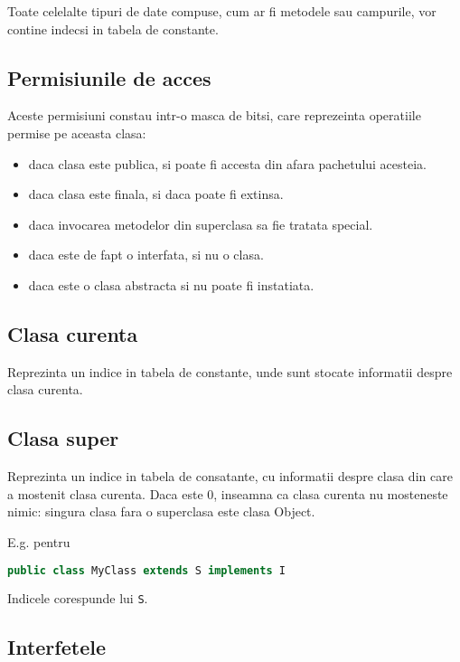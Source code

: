 Toate celelalte tipuri de date compuse, cum ar fi metodele sau
campurile, vor contine indecsi in tabela de constante.

\subsection{Permisiunile de acces}

Aceste permisiuni constau intr-o masca de bitsi, care reprezeinta
operatiile permise pe aceasta clasa:

\begin{itemize}
    \item daca clasa este publica, si poate fi accesta din afara pachetului acesteia.
    \item daca clasa este finala, si daca poate fi extinsa.
    \item daca invocarea metodelor din superclasa sa fie tratata special.
    \item daca este de fapt o interfata, si nu o clasa.
    \item daca este o clasa abstracta si nu poate fi instatiata.
\end{itemize}

\subsection{Clasa curenta}

Reprezinta un indice in tabela de constante, unde sunt stocate
informatii despre clasa curenta.

\subsection{Clasa super}

Reprezinta un indice in tabela de consatante, cu informatii despre clasa
din care a mostenit clasa curenta. Daca este 0, inseamna ca clasa
curenta nu mosteneste nimic: singura clasa fara o superclasa este clasa
Object.

E.g. pentru

\begin{lstlisting}[language=Java]
public class MyClass extends S implements I
\end{lstlisting}

Indicele corespunde lui \texttt{S}.

\subsection{Interfetele}

